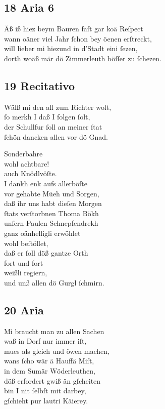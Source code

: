 \documentclass{ees}
\newenvironment{lyrics}[1]{%
  \subsection{#1}\nopagebreak%
  \begin{lyricslist}%
  \let\voice\item%
}{%
  \end{lyricslist}%
}
\begin{document}
\begin{lyrics}{18 Aria 6}
  \voice[Barthlme]
  Äß iß hiez beym Bauren faſt gar koä Reſpect\\
  wann oäner viel Jahr ſchon bey öenen erſtreckt,\\
  will lieber mi hiezund in d’Stadt eini ſezen,\\
  dorth woäß mär dö Zimmerleuth böſſer zu ſchezen.
\end{lyrics}

\begin{lyrics}{19 Recitativo}
  \voice[Schnepfendrekh]
  Wälß mi den all zum Richter wolt,\\
  ſo merkh I daß I folgen ſolt,\\
  der Schullfur ſoll an meiner ſtat\\
  ſchön dancken allen vor dö Gnad.

  \voice[Schullmeiſter]
  Sonderbahre \\
  wohl achtbare!\\
  auch Knödlvöſte.\\
  I dankh enk aufs allerböſte\\
  vor gehabte Müeh und Sorgen,\\
  daß ihr uns habt dieſen Morgen\\
  ſtats verſtorbnen Thoma Bökh\\
  unſern Paulen Schnepfendrekh\\
  ganz oänhelligli erwöhlet\\
  wohl beſtöllet,\\
  daß er ſoll döß gantze Orth\\
  fort und fort\\
  weißli regiern,\\
  und unß allen dö Gurgl ſchmirn.
\end{lyrics}

\begin{lyrics}{20 Aria}
  \voice[Schullmeiſter]
  Mi braucht man zu allen Sachen\\
  waß in Dorf nur immer iſt,\\
  mues als gleich und öwen machen,\\
  wans ſcho wär ä Hauffä Miſt,\\
  in dem Sumär Wöderleuthen,\\
  döß erfordert gwiß än gſcheiten\\
  bin I nit ſelbſt mit darbey,\\
  gſchieht pur lautri Käierey.
\end{lyrics}
\end{document}
